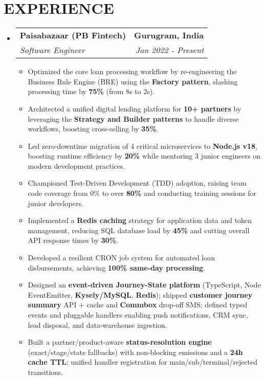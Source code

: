 \documentclass[letterpaper,11pt]{article}
\makeatletter
\newcommand{\resumeSubheading}[4]{
  \vspace{-2pt}\item
    \begin{tabular*}{1.0\textwidth}[t]{l@{\extracolsep{\fill}}r}
      \textbf{\large#1} & \textbf{\small #2} \\
      \textit{\large#3} & \textit{\small #4} \\
    \end{tabular*}\vspace{-7pt}
}
\newcommand{\resumeItem}[1]{
  \item\small{
    {#1 \vspace{-2pt}}
  }
}
\newcommand{\resumeSubHeadingListStart}{\begin{itemize}[leftmargin=0.0in, label={}]}
\newcommand{\resumeSubHeadingListEnd}{\end{itemize}}
\newcommand{\resumeItemListStart}{\begin{itemize}}
\newcommand{\resumeItemListEnd}{\end{itemize}\vspace{-5pt}}
\makeatother
\begin{document}
\section{EXPERIENCE}
  \resumeSubHeadingListStart
    \resumeSubheading
      {Paisabazaar (PB Fintech)}{Gurugram, India}
      {Software Engineer}{Jan 2022 - Present}
      \resumeItemListStart
        \resumeItem{Optimized the core loan processing workflow by re-engineering the Business Rule Engine (BRE) using the \textbf{Factory pattern}, slashing processing time by \textbf{75\%} (from 8s to 2s).}
        \resumeItem{Architected a unified digital lending platform for \textbf{10+ partners} by leveraging the \textbf{Strategy and Builder patterns} to handle diverse workflows, boosting cross-selling by \textbf{35\%}.}
        \resumeItem{Led zero-downtime migration of 4 critical microservices to \textbf{Node.js v18}, boosting runtime efficiency by \textbf{20\%} while mentoring 3 junior engineers on modern development practices.}
        \resumeItem{Championed Test-Driven Development (TDD) adoption, raising team code coverage from 0\% to over \textbf{80\%} and conducting training sessions for junior developers.}
        \resumeItem{Implemented a \textbf{Redis caching} strategy for application data and token management, reducing SQL database load by \textbf{45\%} and cutting overall API response times by \textbf{30\%}.}
        \resumeItem{Developed a resilient CRON job system for automated loan disbursements, achieving \textbf{100\% same-day processing}.}
        \resumeItem{Designed an \textbf{event-driven Journey-State platform} (TypeScript, Node EventEmitter, \textbf{Kysely/MySQL}, \textbf{Redis}); shipped \textbf{customer journey summary} API + cache and \textbf{Commbox} drop-off SMS; defined typed events and pluggable handlers enabling push notifications, CRM sync, lead disposal, and data-warehouse ingestion.}
        \resumeItem{Built a partner/product-aware \textbf{status-resolution engine} (exact/stage/state fallbacks) with non-blocking emissions and a \textbf{24h cache TTL}; unified handler registration for main/sub/terminal/rejected transitions.}
      \resumeItemListEnd
  \resumeSubHeadingListEnd

\end{document}

